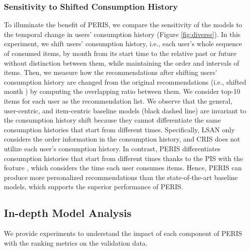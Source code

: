 \documentclass[sigconf]{acmart}
\newcommand{\MD}{{\small\textsf{PERIS}}}
\begin{document}
\subsubsection{\textbf{Sensitivity to Shifted Consumption History}}
To illuminate the benefit of \MD, we compare the sensitivity of the models to the temporal change in users' consumption history (Figure \ref{fig:diverse}). In this experiment, we shift users' consumption history, i.e., each user's whole sequence of consumed items, by month from its start time to the relative past or future without distinction between them, while maintaining the order and intervals of items. Then, we measure how the recommendations after shifting users' consumption history are changed from the original recommendations (i.e., shifted month ) by computing the overlapping ratio between them. We consider top-10 items for each user  as the recommendation list. 
We observe that the general, user-centric, and item-centric baseline models (black dashed line) are invariant to the consumption history shift because they cannot differentiate the same consumption histories that start from different times. Specifically, LSAN only considers the order information in the consumption history, and CRIS does not utilize each user's consumption history.
In contrast, \MD{} differentiates consumption histories that start from different times thanks to the PIS with the feature , which considers the time each user consumes items. Hence, \MD{} can produce more personalized recommendations than the state-of-the-art baseline models, which supports the superior performance of \MD{}. 


\subsection{In-depth Model Analysis}
We provide experiments to understand the impact of each component of \MD{} with the ranking metrics on the validation data. 
\end{document}
